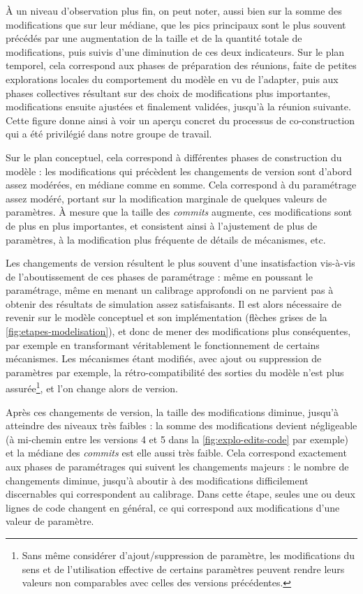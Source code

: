 À un niveau d'observation plus fin, on peut noter, aussi bien sur la somme des modifications que sur leur médiane, que les pics principaux sont le plus souvent précédés par une augmentation de la taille et de la quantité totale de modifications, puis suivis d'une diminution de ces deux indicateurs.
Sur le plan \og temporel\fg{}, cela correspond aux phases de préparation des réunions, faite de petites explorations locales du comportement du modèle en vu de l'adapter, puis aux phases collectives résultant sur des choix de modifications plus importantes, modifications ensuite ajustées et finalement validées, jusqu'à la réunion suivante.
Cette figure donne ainsi à voir un aperçu concret du processus de co-construction qui a été privilégié dans notre groupe de travail.

Sur le plan conceptuel, cela correspond à différentes phases de construction du modèle : les modifications qui précèdent les changements de version sont d'abord assez modérées, en médiane comme en somme.
Cela correspond à du paramétrage assez modéré, portant sur la modification marginale de quelques valeurs de paramètres.
À mesure que la taille des \textit{commits} augmente, ces modifications sont de plus en plus importantes, et consistent ainsi à l'ajustement de plus de paramètres, à la modification plus fréquente de détails de mécanismes, etc.

Les changements de version résultent le plus souvent d'une insatisfaction vis-à-vis de l'aboutissement de ces phases de paramétrage : même en poussant le paramétrage, même en menant un calibrage approfondi on ne parvient pas à obtenir des résultats de simulation assez satisfaisants.
Il est alors nécessaire de revenir sur le modèle conceptuel et son implémentation (flèches grises de la \cref{fig:etapes-modelisation}), et donc de mener des modifications plus conséquentes, par exemple en transformant véritablement le fonctionnement de certains mécanismes.
Les mécanismes étant modifiés, avec ajout ou suppression de paramètres par exemple, la rétro-compatibilité des sorties du modèle n'est plus assurée\footnote{
	Sans même considérer d'ajout/suppression de paramètre, les modifications du sens et de l'utilisation effective de certains paramètres peuvent rendre leurs valeurs non comparables avec celles des versions précédentes.
}, et l'on change alors de version.

Après ces changements de version, la taille des modifications diminue, jusqu'à atteindre des niveaux très faibles : la somme des modifications devient négligeable (à mi-chemin entre les versions 4 et 5 dans la \cref{fig:explo-edits-code} par exemple)  et la médiane des \textit{commits} est elle aussi très faible.
Cela correspond exactement aux phases de paramétrages qui suivent les changements majeurs : le nombre de changements diminue, jusqu'à aboutir à des modifications difficilement discernables qui correspondent au calibrage.
Dans cette étape, seules une ou deux lignes de code changent en général, ce qui correspond aux modifications d'une valeur de paramètre.

